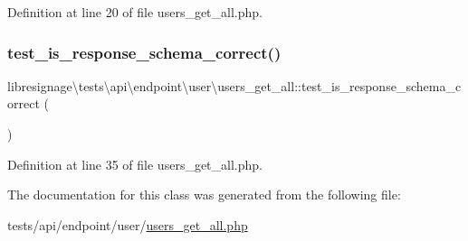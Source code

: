 Definition at line 20 of file users\+\_\+get\+\_\+all.\+php.

\mbox{\label{classlibresignage_1_1tests_1_1api_1_1endpoint_1_1user_1_1users__get__all_ac238429241430fc3c5b2524d2174fbb6}} 
\subsubsection{\texorpdfstring{test\+\_\+is\+\_\+response\+\_\+schema\+\_\+correct()}{test\_is\_response\_schema\_correct()}}
{\footnotesize\ttfamily libresignage\textbackslash{}tests\textbackslash{}api\textbackslash{}endpoint\textbackslash{}user\textbackslash{}users\+\_\+get\+\_\+all\+::test\+\_\+is\+\_\+response\+\_\+schema\+\_\+correct (\begin{DoxyParamCaption}{ }\end{DoxyParamCaption})}



Definition at line 35 of file users\+\_\+get\+\_\+all.\+php.



The documentation for this class was generated from the following file\+:\begin{DoxyCompactItemize}
\item 
tests/api/endpoint/user/\hyperlink{tests_2api_2endpoint_2user_2users__get__all_8php}{users\+\_\+get\+\_\+all.\+php}\end{DoxyCompactItemize}

